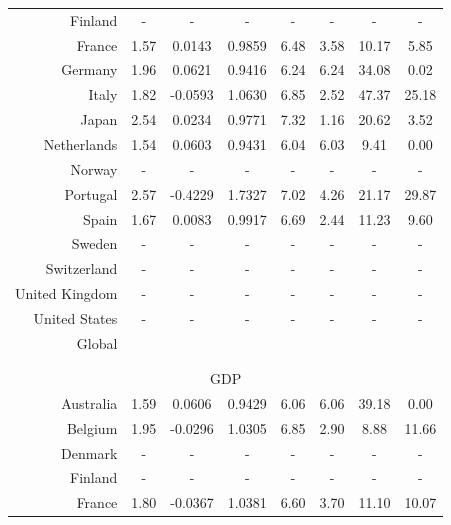 {{{{{{{{{{\begin{table}[H]
\begin{center}
\begin{tabular}{rccccccc}
Finland & - & - & - & - & - & - &  -\\  

France & 1.57 & 0.0143 & 0.9859 & 6.48 & 3.58 & 10.17 &  5.85\\ 

Germany & 1.96 & 0.0621 & 0.9416 & 6.24 & 6.24 & 34.08 &  0.02\\ 

Italy & 1.82 & -0.0593 & 1.0630 & 6.85 & 2.52 & 47.37 &  25.18\\ 

Japan & 2.54 & 0.0234 & 0.9771 & 7.32 & 1.16 & 20.62 &  3.52\\ 

Netherlands & 1.54 & 0.0603 & 0.9431 & 6.04 & 6.03 & 9.41 &  0.00\\ 

Norway & - & - & - & - & - & - &  -\\  

Portugal & 2.57 & -0.4229 & 1.7327 & 7.02 & 4.26 & 21.17 &  29.87\\ 

Spain & 1.67 & 0.0083 & 0.9917 & 6.69 & 2.44 & 11.23 &  9.60\\ 

Sweden & - & - & - & - & - & - &  -\\  

Switzerland & - & - & - & - & - & - &  -\\   

United Kingdom & - & - & - & - & - & - &  -\\  

United States & - & - & - & - & - & - &  -\\  
\hline
Global & & & & & & &\\
\hline
 & & & & & \\
  & & & & & \\
\hline
\multicolumn{8}{c}{GDP}\\
\hline
Australia & 1.59 & 0.0606 & 0.9429 & 6.06 & 6.06 & 39.18 & 0.00\\ 

Belgium & 1.95 & -0.0296 & 1.0305 & 6.85 & 2.90 & 8.88 &  11.66\\ 

Denmark & - & - & - & - & - & - &  -\\ 

Finland & - & - & - & - & - & - &  -\\ 

France & 1.80 & -0.0367 & 1.0381 & 6.60 & 3.70 & 11.10 &  10.07\\ 


\end{tabular}
\end{center}
\end{table}}}}}}}}}}}
